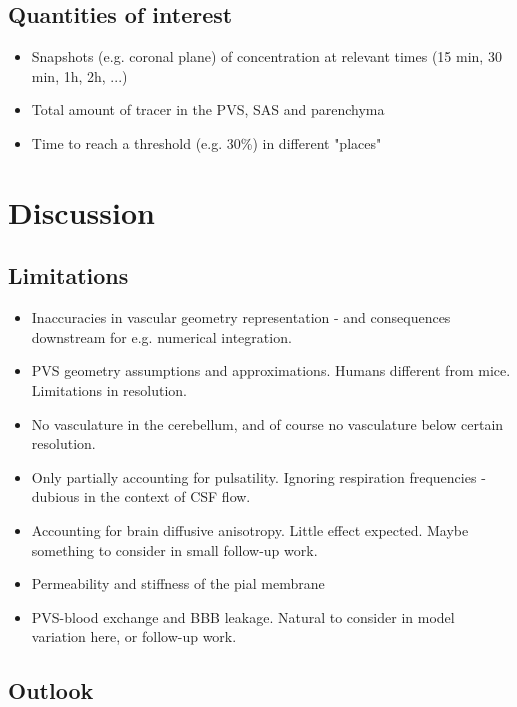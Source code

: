 \documentclass[fleqn,10pt]{wlscirep}
\begin{document}
\subsection*{Quantities of interest}

\begin{itemize}
    \item Snapshots (e.g. coronal plane) of concentration at relevant times (15 min, 30 min, 1h, 2h, ...) 
    \item Total amount of tracer in the PVS, SAS and parenchyma
     \item Time to reach a threshold (e.g. 30\%) in different "places"
\end{itemize}


\newpage
\section*{Discussion}

\subsection*{Limitations}

\begin{itemize}
\item 
  Inaccuracies in vascular geometry representation - and consequences downstream for e.g. numerical integration.
\item
  PVS geometry assumptions and approximations. Humans different from mice. Limitations in resolution.
\item
  No vasculature in the cerebellum, and of course no vasculature below certain resolution.
\item
  Only partially accounting for pulsatility. Ignoring respiration frequencies - dubious in the context of CSF flow.
\item
  Accounting for brain diffusive anisotropy. Little effect expected. Maybe something to consider in small follow-up work.
\item
  Permeability and stiffness of the pial membrane
\item
  PVS-blood exchange and BBB leakage. Natural to consider in model variation here, or follow-up work.
\end{itemize}

\subsection*{Outlook}
\end{document}
